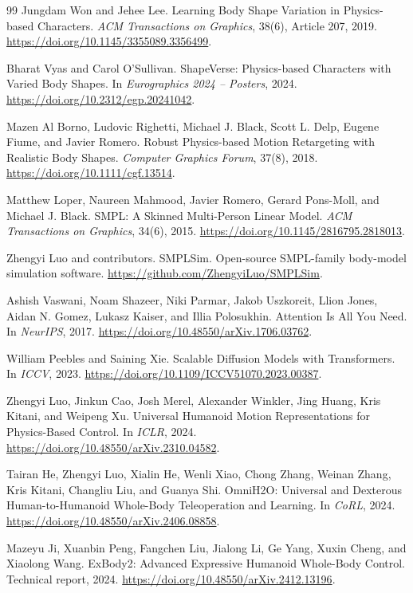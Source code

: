 \begin{thebibliography}{99}
Jungdam Won and Jehee Lee.
Learning Body Shape Variation in Physics-based Characters.
\emph{ACM Transactions on Graphics}, 38(6), Article 207, 2019.
\url{https://doi.org/10.1145/3355089.3356499}.

Bharat Vyas and Carol O'Sullivan.
ShapeVerse: Physics-based Characters with Varied Body Shapes.
In \emph{Eurographics 2024 -- Posters}, 2024.
\url{https://doi.org/10.2312/egp.20241042}.

Mazen Al Borno, Ludovic Righetti, Michael J. Black, Scott L. Delp,
Eugene Fiume, and Javier Romero.
Robust Physics-based Motion Retargeting with Realistic Body Shapes.
\emph{Computer Graphics Forum}, 37(8), 2018.
\url{https://doi.org/10.1111/cgf.13514}.

Matthew Loper, Naureen Mahmood, Javier Romero, Gerard Pons-Moll,
and Michael J. Black.
SMPL: A Skinned Multi-Person Linear Model.
\emph{ACM Transactions on Graphics}, 34(6), 2015.
\url{https://doi.org/10.1145/2816795.2818013}.

Zhengyi Luo and contributors.
SMPLSim.
Open-source SMPL-family body-model simulation software.
\url{https://github.com/ZhengyiLuo/SMPLSim}.

Ashish Vaswani, Noam Shazeer, Niki Parmar, Jakob Uszkoreit, Llion Jones,
Aidan N. Gomez, Lukasz Kaiser, and Illia Polosukhin.
Attention Is All You Need.
In \emph{NeurIPS}, 2017.
\url{https://doi.org/10.48550/arXiv.1706.03762}.

William Peebles and Saining Xie.
Scalable Diffusion Models with Transformers.
In \emph{ICCV}, 2023.
\url{https://doi.org/10.1109/ICCV51070.2023.00387}.

Zhengyi Luo, Jinkun Cao, Josh Merel, Alexander Winkler, Jing Huang,
Kris Kitani, and Weipeng Xu.
Universal Humanoid Motion Representations for Physics-Based Control.
In \emph{ICLR}, 2024.
\url{https://doi.org/10.48550/arXiv.2310.04582}.

Tairan He, Zhengyi Luo, Xialin He, Wenli Xiao, Chong Zhang, Weinan Zhang,
Kris Kitani, Changliu Liu, and Guanya Shi.
OmniH2O: Universal and Dexterous Human-to-Humanoid Whole-Body
Teleoperation and Learning.
In \emph{CoRL}, 2024.
\url{https://doi.org/10.48550/arXiv.2406.08858}.

Mazeyu Ji, Xuanbin Peng, Fangchen Liu, Jialong Li, Ge Yang, Xuxin Cheng,
and Xiaolong Wang.
ExBody2: Advanced Expressive Humanoid Whole-Body Control.
Technical report, 2024.
\url{https://doi.org/10.48550/arXiv.2412.13196}.


\end{thebibliography}
